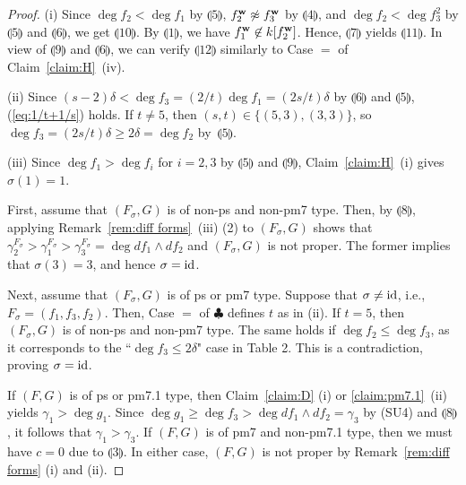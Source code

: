 \documentclass{amsart}
\theoremstyle{plain}
\theoremstyle{definition}
\newcommand{\id}{{\rm id}}
\newcommand{\w}{{\bf w}}
\begin{document}
\begin{proof}
(i) 
Since $\deg f_2<\deg f_1$ by $\llparenthesis 5 \rrparenthesis$, 
$f_2^{\w }\not\approx f_3^{\w }$ by $\llparenthesis 4 \rrparenthesis$, 
and 
$\deg f_2<\deg f_3^2$ 
by $\llparenthesis 5 \rrparenthesis$ and $\llparenthesis 6 \rrparenthesis$, 
we get $\llparenthesis 10 \rrparenthesis$. 
By $\llparenthesis 1 \rrparenthesis$, 
we have $f_1^{\w }\not\in k[f_2^{\w }]$. 
Hence, 
$\llparenthesis 7 \rrparenthesis$ 
yields $\llparenthesis 11 \rrparenthesis$. 
In view of $\llparenthesis 9 \rrparenthesis$ 
and $\llparenthesis 6 \rrparenthesis$, 
we can verify $\llparenthesis 12 \rrparenthesis$ 
similarly to Case $=$ of Claim~\ref{claim:H}~(iv). 


(ii) 
Since $(s-2)\delta <\deg f_3=(2/t)\deg f_1=(2s/t)\delta $ by 
$\llparenthesis 6 \rrparenthesis$ and $\llparenthesis 5 \rrparenthesis$, 
(\ref{eq:1/t+1/s}) holds. 
If $t\ne 5$, 
then $(s,t)\in \{ (5,3),(3,3)\} $, 
so $\deg f_3=(2s/t)\delta \ge 2\delta =\deg f_2$ 
by~$\llparenthesis 5 \rrparenthesis$. 



(iii) 
Since $\deg f_1>\deg f_i$ for $i=2,3$ by 
$\llparenthesis 5 \rrparenthesis$ and $\llparenthesis 9 \rrparenthesis$, 
Claim~\ref{claim:H}~(i) gives $\sigma (1)=1$. 




First, assume that 
$(F_\sigma ,G)$ is of non-ps and non-pm7 type. 
Then, by $\llparenthesis 8 \rrparenthesis$, 
applying Remark~\ref{rem:diff forms}~(iii) (2) to $(F_\sigma ,G)$ 
shows that 
$\gamma _2^{F_\sigma }>\gamma _1^{F_\sigma }>\gamma _3^{F_\sigma }
=\deg df_1\wedge df_2$ 
and $(F_{\sigma },G)$ is not proper. 
The former implies that $\sigma (3)=3$, and hence $\sigma =\id $. 



Next, assume that $(F_\sigma ,G)$ is of ps or pm7 type. 
Suppose that 
$\sigma \ne \id $, i.e.,~$F_\sigma =(f_1,f_3,f_2)$. 
Then, 
Case $=$ of $\clubsuit $ defines $t$ as in (ii). 
If $t=5$, 
then $(F_\sigma ,G)$ is of non-ps and non-pm7 type. 
The same holds if $\deg f_2\le \deg f_3$, 
as it corresponds to the ``$\deg f_3\le 2\delta $" case 
in Table 2. 
This is a contradiction, proving $\sigma =\id $. 



If $(F,G)$ is of ps or pm7.1 type, 
then Claim~\ref{claim:D} (i) or \ref{claim:pm7.1}~(ii) 
yields $\gamma _1>\deg g_1$. 
Since $\deg g_1\ge \deg f_3>\deg df_1\wedge df_2=\gamma _3$ 
by (SU4) and $\llparenthesis 8 \rrparenthesis$, 
it follows that $\gamma _1>\gamma _3$. 
If $(F,G)$ is of pm7 and non-pm7.1 type, 
then we must have $c=0$ due to 
$\llparenthesis 3 \rrparenthesis$. 
In either case, 
$(F,G)$ is not proper 
by Remark~\ref{rem:diff forms} (i) and (ii). 
\end{proof}
\end{document}
